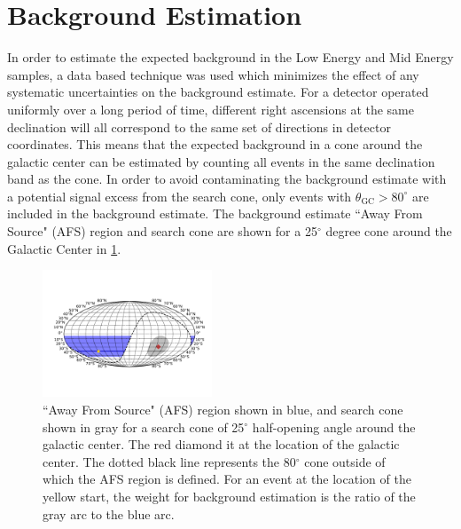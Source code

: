\section{Background Estimation}
\label{sec:background_estimation}
In order to estimate the expected background in the Low Energy and Mid Energy samples, a data based technique was used which minimizes the effect of any systematic uncertainties on the background estimate. For a detector operated uniformly over a long period of time, different right ascensions at the same declination will all correspond to the same set of directions in detector coordinates.  This means that the expected background in a cone around the galactic center can be estimated by counting all events in the same declination band as the cone.  In order to avoid contaminating the background estimate with a potential signal excess from the search cone, only events with $\theta_\textrm{GC}>80^\circ$ are included in the background estimate.  The background estimate ``Away From Source" (AFS) region and search cone are shown for a 25$^\circ$ degree cone around the Galactic Center in \cref{fig:afs_regions_skymap}. 
 

\begin{figure} 
\includegraphics[width=0.45\textwidth]{figures/AFS_witharcs.pdf}
\caption{``Away From Source" (AFS) region shown in blue, and search cone shown in gray for a search cone of 25$^\circ$ half-opening angle around the galactic center.  The red diamond it at the location of the galactic center.  The dotted black line represents the 80$^\circ$ cone outside of which the AFS region is defined.  For an event at the location of the yellow start, the weight for background estimation is the ratio of the gray arc to the blue arc.}
\label{fig:afs_regions_skymap}
\end{figure}

